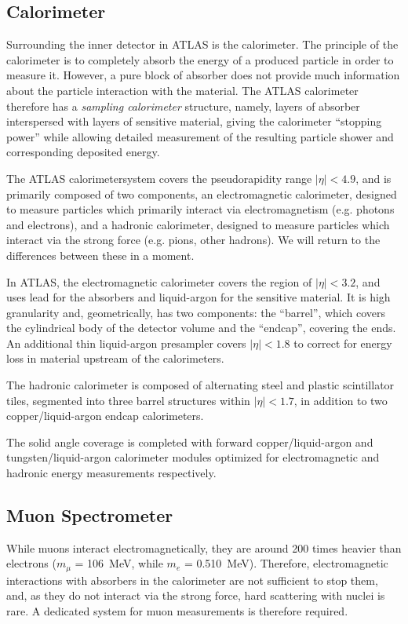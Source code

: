 \subsection{Calorimeter}
Surrounding the inner detector in ATLAS is the calorimeter. The principle of the calorimeter is to 
completely absorb the energy of a produced particle in order to measure it. However, a pure block 
of absorber does not provide much information about the particle interaction with the material. 
The ATLAS calorimeter therefore has a \emph{sampling calorimeter} structure, namely, layers 
of absorber interspersed with layers of sensitive material, giving the calorimeter ``stopping power'' 
while allowing detailed measurement of the resulting particle shower and corresponding deposited energy.

The ATLAS calorimetersystem covers the pseudorapidity range \(|\eta| < 4.9\), 
and is primarily composed of two components, an electromagnetic calorimeter, 
designed to measure particles which primarily interact via electromagnetism 
(e.g. photons and electrons), and a hadronic calorimeter, designed to measure 
particles which interact via the strong force (e.g. pions, other hadrons). We 
will return to the differences between these in a moment. 

In ATLAS, the electromagnetic calorimeter covers the region of \(|\eta|< 3.2\),
and uses lead for the absorbers and liquid-argon for the sensitive material. It is high 
granularity and, geometrically, has two components: the ``barrel'', which covers the cylindrical body 
of the detector volume and the ``endcap'', covering the ends. An additional thin liquid-argon presampler 
covers \(|\eta| < 1.8\) to correct for energy loss in material upstream of the calorimeters.

The hadronic calorimeter is composed of alternating steel and plastic scintillator tiles,
segmented into three barrel structures within \(|\eta| < 1.7\), in addition to two copper/liquid-argon 
endcap calorimeters.

The solid angle coverage is completed with forward copper/liquid-argon and tungsten/liquid-argon 
calorimeter modules optimized for electromagnetic and hadronic energy measurements respectively.

\subsection{Muon Spectrometer}
While muons interact electromagnetically, they are around 200 times heavier than electrons 
($m_{\mu}$ = \SI{106}{\MeV}, while $m_{e}$ = \SI{0.510}{\MeV}). 
Therefore, electromagnetic interactions with absorbers in the calorimeter 
are not sufficient to stop them, and, as they do not interact via the strong force, hard scattering with 
nuclei is rare. A dedicated system for muon measurements is therefore required. 

